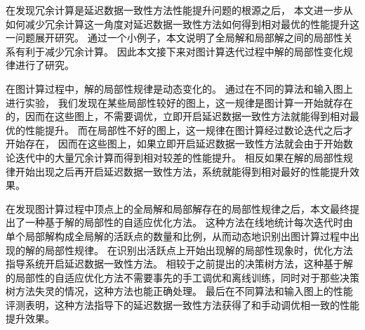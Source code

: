 在发现冗余计算是延迟数据一致性方法性能提升问题的根源之后，
本文进一步从如何减少冗余计算这一角度对延迟数据一致性方法如何得到相对最优的性能提升这一问题展开研究。
通过一个小例子，本文说明了全局解和局部解之间的局部性关系有利于减少冗余计算。
因此本文接下来对图计算迭代过程中解的局部性变化规律进行了研究。



在图计算过程中，解的局部性规律是动态变化的。
通过在不同的算法和输入图上进行实验，
我们发现在某些局部性较好的图上，这一规律是图计算一开始就存在的，因而在这些图上，不需要调优，立即开启延迟数据一致性方法就能得到相对最优的性能提升。
而在局部性不好的图上，这一规律在图计算经过数论迭代之后才开始存在，
因而在这些图上，如果立即开启延迟数据一致性方法就会由于开始数论迭代中的大量冗余计算而得到相对较差的性能提升。
相反如果在解的局部性规律开始出现之后再开启延迟数据一致性方法，系统就能得到相对最好的性能提升效果。


在发现图计算过程中顶点上的全局解和局部解存在的局部性规律之后，本文最终提出了一种基于解的局部性的自适应优化方法。
这种方法在线地统计每次迭代时由单个局部解构成全局解的活跃点的数量和比例，从而动态地识别出图计算过程中出现的解的局部性规律。
在识别出活跃点上开始出现解的局部性现象时，优化方法指导系统开启延迟数据一致性方法。
相较于之前提出的决策树方法，这种基于解的局部性的自适应优化方法不需要事先的手工调优和离线训练，同时对于那些决策树方法失灵的情况，这种方法也能正确处理。
最后在不同算法和输入图上的性能评测表明，这种方法指导下的延迟数据一致性方法获得了和手动调优相一致的性能提升效果。

